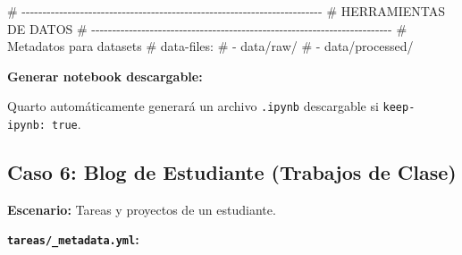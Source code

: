 \documentclass[
  doc,
  floatsintext,
  longtable,
  a4paper,
  nolmodern,
  notxfonts,
  notimes,
  12pt,
  colorlinks=true,linkcolor=blue,citecolor=blue,urlcolor=blue]{apa7}
\newenvironment{Shaded}{\begin{snugshade}}{\end{snugshade}}
\newcommand{\CommentTok}[1]{\textcolor[rgb]{0.37,0.37,0.37}{#1}}
\begin{document}
\begin{Shaded}
\begin{Highlighting}[]
\CommentTok{\# {-}{-}{-}{-}{-}{-}{-}{-}{-}{-}{-}{-}{-}{-}{-}{-}{-}{-}{-}{-}{-}{-}{-}{-}{-}{-}{-}{-}{-}{-}{-}{-}{-}{-}{-}{-}{-}{-}{-}{-}{-}{-}{-}{-}{-}{-}{-}{-}{-}{-}{-}{-}{-}{-}{-}{-}{-}{-}{-}{-}{-}{-}{-}{-}{-}{-}{-}{-}{-}{-}{-}{-}}
\CommentTok{\# HERRAMIENTAS DE DATOS}
\CommentTok{\# {-}{-}{-}{-}{-}{-}{-}{-}{-}{-}{-}{-}{-}{-}{-}{-}{-}{-}{-}{-}{-}{-}{-}{-}{-}{-}{-}{-}{-}{-}{-}{-}{-}{-}{-}{-}{-}{-}{-}{-}{-}{-}{-}{-}{-}{-}{-}{-}{-}{-}{-}{-}{-}{-}{-}{-}{-}{-}{-}{-}{-}{-}{-}{-}{-}{-}{-}{-}{-}{-}{-}{-}}
\CommentTok{\# Metadatos para datasets}
\CommentTok{\# data{-}files:}
\CommentTok{\#   {-} data/raw/}
\CommentTok{\#   {-} data/processed/}
\end{Highlighting}
\end{Shaded}

\textbf{Generar notebook descargable:}

Quarto automáticamente generará un archivo \texttt{.ipynb} descargable
si \texttt{keep-ipynb:\ true}.

\subsection{Caso 6: Blog de Estudiante (Trabajos de
Clase)}\label{caso-6-blog-de-estudiante-trabajos-de-clase}

\textbf{Escenario:} Tareas y proyectos de un estudiante.

\textbf{\texttt{tareas/\_metadata.yml}:}
\end{document}
